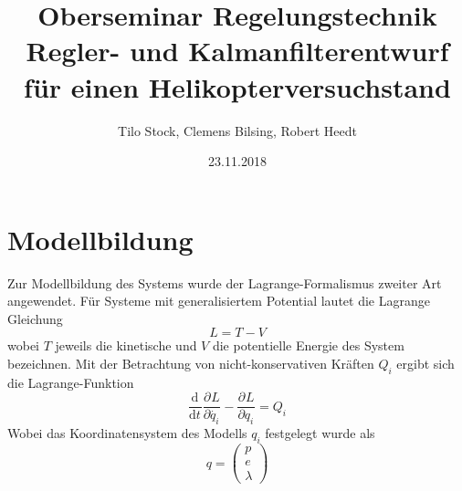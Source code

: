\documentclass{article}
\title{Oberseminar Regelungstechnik \\ Regler- und Kalmanfilterentwurf für einen Helikopterversuchstand}
\author{Tilo Stock, Clemens Bilsing, Robert Heedt}
\date {23.11.2018}
\newcommand{\partiell}[3][]{\frac{\partial^{#1}#2}{\partial{#3}^{#1}}}
\newcommand{\diff}[3][]{\frac{\mathrm{d}^{#1}#2}{\mathrm{d}{#3}^{#1}}}
\begin{document}
\maketitle
\tableofcontents
\newpage
\section{Modellbildung}
Zur Modellbildung des Systems wurde der Lagrange-Formalismus zweiter Art angewendet. Für Systeme mit generalisiertem Potential lautet die Lagrange Gleichung 
\begin{equation}
L = T -V
\end{equation}
wobei $T$ jeweils die kinetische und $V$ die potentielle Energie des System bezeichnen.
Mit der Betrachtung von nicht-konservativen Kräften $Q_i$ ergibt sich die Lagrange-Funktion
\begin{equation}\label{eq:lagrange}
\diff{}{t} \partiell{L}{\dot{q_i}} - \partiell{L}{q_i}=Q_i
\end{equation}
Wobei das Koordinatensystem des Modells $q_i$ festgelegt wurde als
\begin{equation}
q = \begin{pmatrix}
p\\e\\\lambda
\end{pmatrix}
\end{equation}
\end{document}
